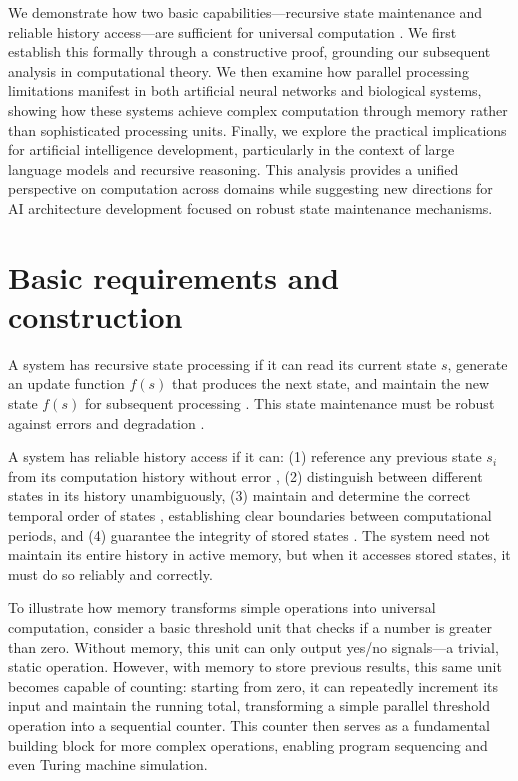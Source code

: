 \documentclass[12pt]{article}
\begin{document}
We demonstrate how two basic capabilities---recursive state maintenance and reliable history access---are sufficient for universal computation \cite{bennett1989time,boyle2024memory}.
We first establish this formally through a constructive proof, grounding our subsequent analysis in computational theory.
We then examine how parallel processing limitations manifest in both artificial neural networks and biological systems, showing how these systems achieve complex computation through memory rather than sophisticated processing units.
Finally, we explore the practical implications for artificial intelligence development, particularly in the context of large language models and recursive reasoning.
This analysis provides a unified perspective on computation across domains while suggesting new directions for AI architecture development focused on robust state maintenance mechanisms.

\section{Basic requirements and construction}

A system has recursive state processing if it can read its current state $s$, generate an update function $f(s)$ that produces the next state, and maintain the new state $f(s)$ for subsequent processing \cite{manuri2019state}.
This state maintenance must be robust against errors and degradation \cite{yang2013survey}.

A system has reliable history access if it can: (1) reference any previous state $s_i$ from its computation history without error \cite{fu2024memory}, (2) distinguish between different states in its history unambiguously, (3) maintain and determine the correct temporal order of states \cite{berridge2014cell,pastor2020computation}, establishing clear boundaries between computational periods, and (4) guarantee the integrity of stored states \cite{lovkvist2021using}.
The system need not maintain its entire history in active memory, but when it accesses stored states, it must do so reliably and correctly.

To illustrate how memory transforms simple operations into universal computation, consider a basic threshold unit that checks if a number is greater than zero.
Without memory, this unit can only output yes/no signals---a trivial, static operation.
However, with memory to store previous results, this same unit becomes capable of counting: starting from zero, it can repeatedly increment its input and maintain the running total, transforming a simple parallel threshold operation into a sequential counter.
This counter then serves as a fundamental building block for more complex operations, enabling program sequencing and even Turing machine simulation.
\end{document}
